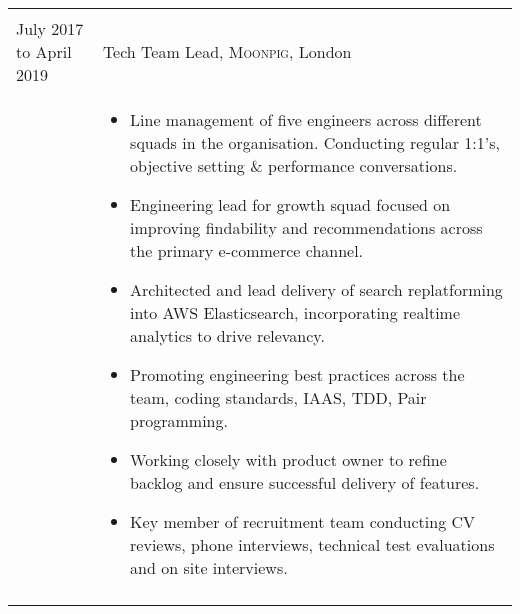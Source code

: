 \documentclass[a4paper,10pt]{article} %
\begin{document}
\begin{tabular}{ L{2cm} | L{11cm}}
	 \\
	July 2017 to April 2019 & Tech Team Lead, \textsc{Moonpig}, London \\
	&\MPtrue
	\begin{itemize}[leftmargin=*]
			\item Line management of five engineers across different squads in the organisation. Conducting regular 1:1's, objective setting \& performance conversations.
			\item Engineering lead for growth squad focused on improving findability and recommendations across the primary e-commerce channel.
			\item Architected and lead delivery of search replatforming into AWS Elasticsearch, incorporating realtime analytics to drive relevancy.
			\item Promoting engineering best practices across the team, coding standards, IAAS, TDD, Pair programming.
			\item Working closely with product owner to refine backlog and ensure successful delivery of features.
			\item Key member of recruitment team conducting CV reviews, phone interviews, technical test evaluations and on site interviews.
		\end{itemize} \\ 
	 \\
\end{tabular}
\clearpage
\end{document}
